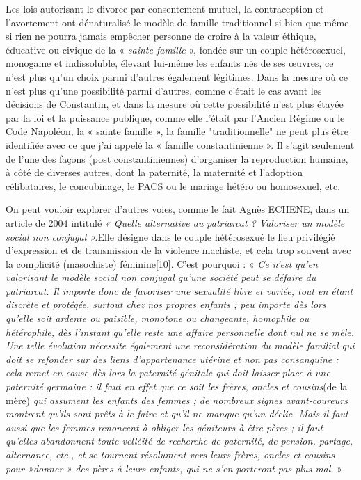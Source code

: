 Les lois autorisant le divorce par consentement mutuel, la contraception et l'avortement ont dénaturalisé le modèle de famille traditionnel si bien que même si rien ne pourra jamais empêcher personne de croire à la valeur éthique, éducative ou civique de la « \emph{sainte famille} », fondée sur un couple hétérosexuel, monogame et indissoluble, élevant lui-même les enfants nés de ses œuvres, ce n'est plus qu'un choix parmi d'autres également légitimes. Dans la mesure où ce n'est plus qu'une possibilité parmi d'autres, comme c'était le cas avant les décisions de Constantin, et dans la mesure où cette possibilité n'est plus étayée par la loi et la puissance publique, comme elle l'était par l'Ancien Régime ou le Code Napoléon, la « sainte famille », la famille "traditionnelle" ne peut plus être identifiée avec ce que j'ai appelé la « famille constantinienne ». Il s'agit seulement de l'une des façons (post constantiniennes) d'organiser la reproduction humaine, à côté de diverses autres, dont la paternité, la maternité et l'adoption célibataires, le concubinage, le PACS ou le mariage hétéro ou homosexuel, etc.
 
 On peut vouloir explorer d'autres voies, comme le fait Agnès ECHENE, dans un article de 2004 intitulé \emph{« Quelle alternative au patriarcat ? Valoriser un modèle social non conjugal ».}Elle désigne dans le couple hétérosexué le lieu privilégié d'expression et de transmission de la violence machiste, et cela trop souvent avec la complicité (masochiste) féminine[10]. C'est pourquoi : « \emph{Ce n'est qu'en valorisant le modèle social non conjugal qu'une société peut se défaire du patriarcat. Il importe donc de favoriser une sexualité libre et variée, tout en étant discrète et protégée, surtout chez nos propres enfants ; peu importe dès lors qu'elle soit ardente ou paisible, monotone ou changeante, homophile ou hétérophile, dès l'instant qu'elle reste une affaire personnelle dont nul ne se mêle. Une telle évolution nécessite également une reconsidération du modèle familial qui doit se refonder sur des liens d'appartenance utérine et non pas consanguine ; cela remet en cause dès lors la paternité génitale qui doit laisser place à une paternité germaine : il faut en effet que ce soit les frères, oncles et cousins}(de la mère)\emph{ qui assument les enfants des femmes ; de nombreux signes avant-coureurs montrent qu'ils sont prêts à le faire et qu'il ne manque qu'un déclic. Mais il faut aussi que les femmes renoncent à obliger les géniteurs à être pères ; il faut qu'elles abandonnent toute velléité de recherche de paternité, de pension, partage, alternance, etc., et se tournent résolument vers leurs frères, oncles et cousins pour »donner » des pères à leurs enfants, qui ne s'en porteront pas plus mal.} » 
 
